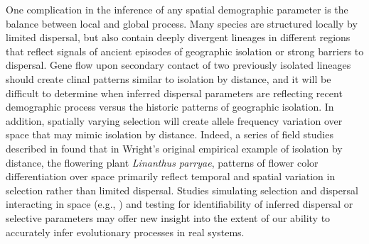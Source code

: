 \documentclass[11pt,twoside,lineno]{preprint}
\begin{document}
One complication in the inference of any spatial demographic parameter is the balance between local and global process. Many species are structured locally by limited dispersal, but also contain deeply divergent lineages in different regions that reflect signals of ancient episodes of geographic isolation or strong barriers to dispersal. Gene flow upon secondary contact of two previously isolated lineages should create clinal patterns similar to isolation by distance, and it will be difficult to determine when inferred dispersal parameters are reflecting recent demographic process versus the historic patterns of geographic isolation. In addition, spatially varying selection will create allele frequency variation over space that may mimic isolation by distance. Indeed, a series of field studies described in \cite{Schemske2007} found that in Wright's original empirical example of isolation by distance, the flowering plant \textit{Linanthus parryae}, patterns of flower color differentiation over space primarily reflect temporal and spatial variation in selection rather than limited dispersal. Studies simulating selection and dispersal interacting in space (e.g., \cite{Ralph2010}) and testing for identifiability of inferred dispersal or selective parameters may offer new insight into the extent of our ability to accurately infer evolutionary processes in real systems. 

\end{document}
